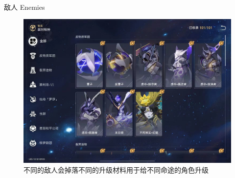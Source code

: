 \documentclass{beamer}
\begin{document}
\begin{frame}{敌人 Enemies}
    \begin{figure}   
        \centering
        \includegraphics[width=0.8\linewidth]{img/8e695de707f7e1c40f78bd780b33f7a.jpg} 
        \caption{不同的敌人会掉落不同的升级材料用于给不同命途的角色升级}
        \label{Forward and Reverse Process}
        \end{figure}
\end{frame}
\end{document}
